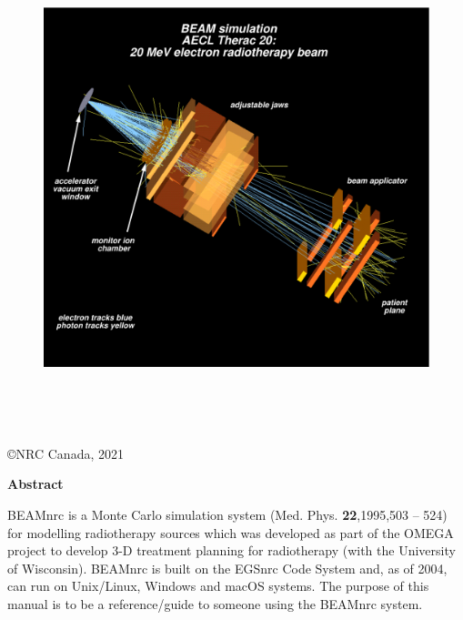 \documentclass[12pt,twoside]{article}
\begin{document}
\begin{figure}[h]
\begin{center}
\leavevmode
\includegraphics[height=14cm]{figures/th20_20-new}
\end{center}
\end{figure}

\begin{center}

\vfill
\copyright NRC Canada, 2021
\end{center}

\setlength{\baselineskip}{0.5cm}
\newpage

\pagestyle{fancy}
\setcounter{page}{2}


\newpage

\begin{center}
\begin{Large}
{\bf Abstract}
\end{Large}
\end{center}
BEAMnrc is a Monte Carlo simulation system (Med. Phys. {\bf 22},1995,503 --
524) for modelling radiotherapy
sources which was developed as part of the OMEGA project to develop 3-D
treatment planning for radiotherapy
(with the University of Wisconsin).  BEAMnrc is built on the
EGSnrc Code System\cite{KR03} and, as of 2004\cite{Ka03}, can run on Unix/Linux,
Windows and macOS systems.
The purpose of this manual is to be a reference/guide to someone
using the BEAMnrc system.
\end{document}
